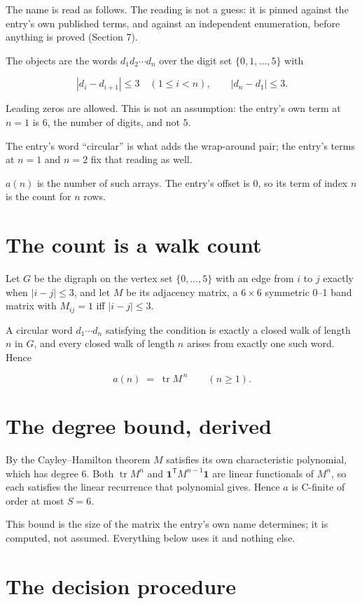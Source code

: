 \documentclass[11pt]{article}
\theoremstyle{definition}
\begin{document}
The name is read as follows. The reading is not a guess: it is pinned against the entry's own published terms, and against an independent enumeration, before anything is proved (Section 7).

The objects are the words $d_1 d_2 \cdots d_n$ over the digit set $\{0,1,\dots,5\}$ with

\[|d_i - d_{i+1}| \le 3\quad (1 \le i < n), \qquad |d_n - d_1| \le 3.\]

Leading zeros are allowed. This is not an assumption: the entry's own term at $n=1$ is $6$, the number of digits, and not $5$.

The entry's word ``circular'' is what adds the wrap-around pair; the entry's terms at $n = 1$ and $n = 2$ fix that reading as well.

$a(n)$ is the number of such arrays. The entry's offset is 0, so its term of index $n$ is the count for $n$ rows.

\section{The count is a walk count}

Let $G$ be the digraph on the vertex set $\{0,\dots,5\}$ with an edge from $i$ to $j$ exactly when $|i-j| \le 3$, and let $M$ be its adjacency matrix, a $6 \times 6$ symmetric 0--1 band matrix with $M_{ij} = 1$ iff $|i-j| \le 3$.

A circular word $d_1\cdots d_n$ satisfying the condition is exactly a closed walk of length $n$ in $G$, and every closed walk of length $n$ arises from exactly one such word. Hence

\[a(n) \;=\; \operatorname{tr} M^{\,n} \qquad (n \ge 1).\]

\section{The degree bound, derived}

By the Cayley--Hamilton theorem $M$ satisfies its own characteristic polynomial, which has degree $6$. Both $\operatorname{tr} M^n$ and $\mathbf 1^{\mathsf T} M^{n-1} \mathbf 1$ are linear functionals of $M^{n}$, so each satisfies the linear recurrence that polynomial gives. Hence $a$ is C-finite of order at most $S = 6$.

This bound is the size of the matrix the entry's own name determines; it is computed, not assumed. Everything below uses it and nothing else.

\section{The decision procedure}
\end{document}
